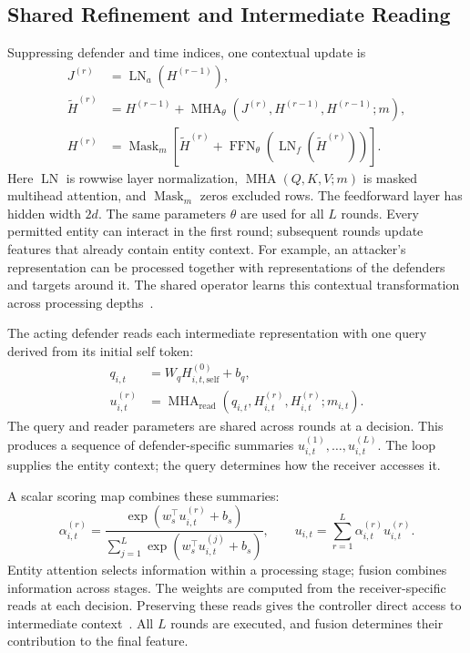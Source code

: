 \subsection{Shared Refinement and Intermediate Reading}
Suppressing defender and time indices, one contextual update is
\begin{align}
 J^{(r)}&=\operatorname{LN}_a(H^{(r-1)}),\nonumber\\
 \widetilde H^{(r)}&=H^{(r-1)}+
       \operatorname{MHA}_{\theta}(J^{(r)},H^{(r-1)},H^{(r-1)};m),\nonumber\\
 H^{(r)}&=\operatorname{Mask}_{m}\!\left[\widetilde H^{(r)}+
       \operatorname{FFN}_{\theta}(\operatorname{LN}_f(\widetilde H^{(r)}))\right].
 \label{eq:loop}
\end{align}
Here $\operatorname{LN}$ is rowwise layer normalization, $\operatorname{MHA}(Q,K,V;m)$ is masked multihead attention, and $\operatorname{Mask}_m$ zeros excluded rows. The feedforward layer has hidden width $2d$. The same parameters $\theta$ are used for all $L$ rounds. Every permitted entity can interact in the first round; subsequent rounds update features that already contain entity context. For example, an attacker's representation can be processed together with representations of the defenders and targets around it. The shared operator learns this contextual transformation across processing depths~\cite{zambaldi2019relational,dehghani2019universal}.

The acting defender reads each intermediate representation with one query derived from its initial self token:
\begin{align}
 q_{i,t}&=W_q H^{(0)}_{i,t,\mathrm{self}}+b_q,\nonumber\\
 u_{i,t}^{(r)}&=\operatorname{MHA}_{\mathrm{read}}
          (q_{i,t},H_{i,t}^{(r)},H_{i,t}^{(r)};m_{i,t}).
 \label{eq:read}
\end{align}
The query and reader parameters are shared across rounds at a decision. This produces a sequence of defender-specific summaries $u_{i,t}^{(1)},\ldots,u_{i,t}^{(L)}$. The loop supplies the entity context; the query determines how the receiver accesses it.

A scalar scoring map combines these summaries:
\begin{equation}
 \alpha_{i,t}^{(r)}=
 \frac{\exp(w_s^\top u_{i,t}^{(r)}+b_s)}
 {\sum_{j=1}^{L}\exp(w_s^\top u_{i,t}^{(j)}+b_s)},\qquad
 u_{i,t}=\sum_{r=1}^{L}\alpha_{i,t}^{(r)}u_{i,t}^{(r)}.
 \label{eq:fusion}
\end{equation}
Entity attention selects information within a processing stage; fusion combines information across stages. The weights are computed from the receiver-specific reads at each decision. Preserving these reads gives the controller direct access to intermediate context~\cite{xu2018jk}. All $L$ rounds are executed, and fusion determines their contribution to the final feature.

